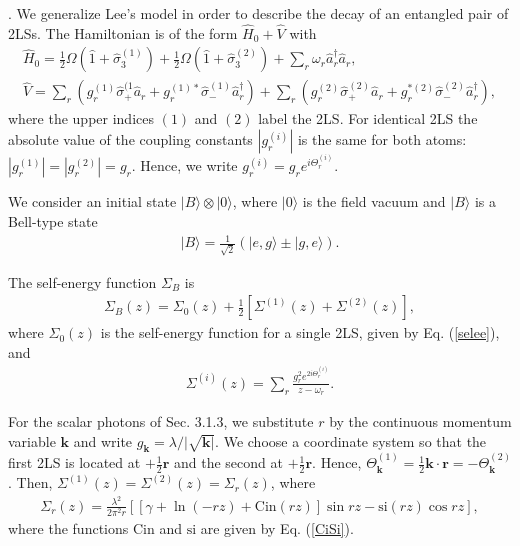 \documentclass[12pt]{article}
\numberwithin{equation}{section}
\begin{document}
\begin{appendix}
\bigskip
{}.    We generalize   Lee's model in order to describe the decay of  an entangled pair of 2LSs. The Hamiltonian   is of the form $\hat{H}_0 + \hat{V}$ with
\begin{eqnarray}
\hat{H}_0= \frac{1}{2} \Omega (\hat{1} + \hat{\sigma}^{(1)}_3) + \frac{1}{2} \Omega (\hat{1} + \hat{\sigma}^{(2)}_3)
 +  \sum_r \omega_r \hat{a}^{\dagger}_r \hat{a}_r,  \label{2h0} \\
\hat{V} = \sum_r \left(g^{(1)}_{r} \hat{\sigma}_+^{(1}   \hat{a}_r + g_{r}^{(1)*}  \hat{\sigma}_-^{(1)}   \hat{a}_r^{\dagger} \right) + \sum_r \left(g_{r}^{(2)} \hat{\sigma}_+^{(2)}   \hat{a}_r + g_r^{*(2)}  \hat{\sigma}_-^{(2)}   \hat{a}_r^{\dagger} \right), \label{2v}
\end{eqnarray}
where the upper indices $(1)$ and $(2)$ label the 2LS.  For identical 2LS the absolute value of the coupling constants $|g^{(i)}_r|$ is the same for both atoms: $|g^{(1)}_r| = |g^{(2)}_r| = g_r$. Hence, we write $g^{(i)}_r = g_r e^{i \Theta^{(i)}_r}$.

We consider an initial state   $|B\rangle \otimes|0\rangle$, where $|0\rangle$ is the field vacuum and $|B\rangle$ is a Bell-type state
\begin{eqnarray}
|B\rangle = \frac{1}{\sqrt{2}}\left(|e,g\rangle \pm |g, e\rangle \right).
\end{eqnarray}

The self-energy function $\Sigma_B$  is
\begin{eqnarray}
\Sigma_B(z) =
\Sigma_0(z) + \frac{1}{2}  [  \Sigma^{(1)}(z) +  \Sigma^{(2)}(z) ], \label{seef2}
\end{eqnarray}
where $\Sigma_0(z)$ is the self-energy function for a single 2LS, given by Eq. (\ref{selee}), and
\begin{eqnarray}
\Sigma^{(i)}(z) = \sum_r \frac{g_r^2e^{2i\Theta_r^{(i)}}}{z- \omega_r}.
\end{eqnarray}

For the  scalar photons  of Sec. 3.1.3,  we substitute $r$  by the continuous momentum variable ${\pmb k}$ and write $g_{\pmb k} = \lambda/|\sqrt{{\pmb k|}}$. We choose a coordinate system so that
  the first 2LS is located at $+\frac{1}{2} {\pmb r}$ and the second at $+\frac{1}{2} {\pmb r}$. Hence,  $\Theta^{(1)}_{\pmb k} = \frac{1}{2} {\pmb k} \cdot {\pmb r} = - \Theta^{(2)}_{\pmb k}$. Then,    $\Sigma^{(1)}(z) = \Sigma^{(2)}(z)  = \Sigma_r(z)$, where
 \begin{eqnarray}
 \Sigma_r(z) =  \frac{\lambda^2}{2\pi^2 r} \left[ [\gamma + \ln(-rz) + \mbox{Cin}(rz)] \sin rz - \mbox{si}(rz)\cos rz\right],
 \end{eqnarray}
 where the
  functions
 $\mbox{Cin}$ and $\mbox{si}$ are   given by Eq. (\ref{CiSi}).


\end{appendix}
\end{document}

